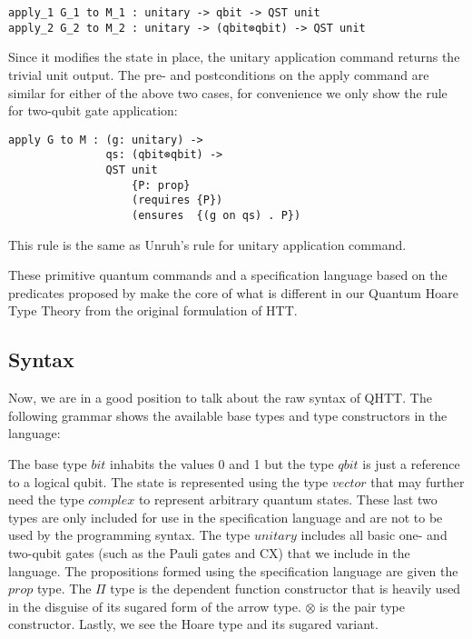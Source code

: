 \documentclass[adraft,creativecommons]{eptcs}
\theoremstyle{definition}
\theoremstyle{remark}
\begin{document}
\begin{lstlisting}[language=QHaskell]
apply_1 G_1 to M_1 : unitary -> qbit -> QST unit
apply_2 G_2 to M_2 : unitary -> (qbit⊗qbit) -> QST unit
\end{lstlisting}

Since it modifies the state in place, the unitary application command returns the trivial unit output. The pre- and postconditions on the apply command are similar for either of the above two cases, for convenience we only show the rule for two-qubit gate application:

\begin{lstlisting}[language=QHaskell]
apply G to M : (g: unitary) ->
               qs: (qbit⊗qbit) ->
               QST unit
                   {P: prop}
                   (requires {P})
                   (ensures  {(g on qs) . P})
\end{lstlisting}

This rule is the same as Unruh's rule for unitary application command.

These primitive quantum commands and a specification language based on the predicates proposed by \textcite{unruh2019} make the core of what is different in our Quantum Hoare Type Theory from the original formulation of HTT.

\subsection{Syntax}

Now, we are in a good position to talk about the raw syntax of QHTT. The following grammar shows the available base types and type constructors in the language:


The base type $bit$ inhabits the values 0 and 1 but the type $qbit$ is just a reference to a logical qubit. The state is represented using the type $vector$ that may further need the type $complex$ to represent arbitrary quantum states. These last two types are only included for use in the specification language and are not to be used by the programming syntax. The type $unitary$ includes all basic one- and two-qubit gates (such as the Pauli gates and CX) that we include in the language. The propositions formed using the specification language are given the $prop$ type. The $\Pi$ type is the dependent function constructor that is heavily used in the disguise of its sugared form of the arrow type. $\otimes$ is the pair type constructor. Lastly, we see the Hoare type and its sugared variant.
\end{document}
